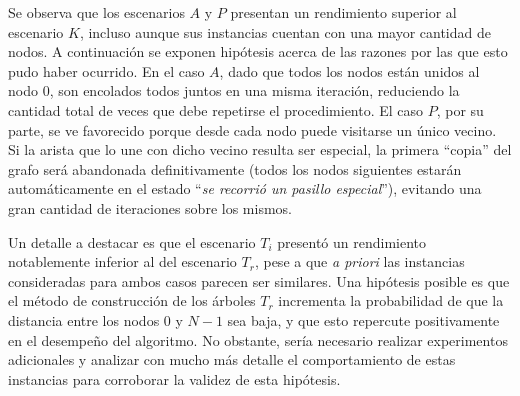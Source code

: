     Se observa que los escenarios $A$ y $P$ presentan un rendimiento
    superior al escenario $K$, incluso aunque sus instancias cuentan con una
    mayor cantidad de nodos. A continuación se exponen hipótesis acerca de
    las razones por las que esto pudo haber ocurrido. En el caso $A$, dado que
    todos los nodos están unidos al nodo $0$, son encolados todos juntos en
    una misma iteración, reduciendo la cantidad total de veces que debe
    repetirse el procedimiento. El caso $P$, por su parte, se ve favorecido
    porque desde cada nodo puede visitarse un único vecino. Si la arista que
    lo une con dicho vecino resulta ser especial, la primera ``copia'' del
    grafo será abandonada definitivamente (todos los nodos siguientes
    estarán automáticamente en el estado ``\emph{se recorrió un pasillo
    especial}''), evitando una gran cantidad de iteraciones sobre los
    mismos.

    Un detalle a destacar es que el escenario $T_i$ presentó un rendimiento
    notablemente inferior al del escenario $T_r$, pese a que \emph{a priori}
    las instancias consideradas para ambos casos parecen ser similares. Una
    hipótesis posible es que el método de construcción de los árboles $T_r$
    incrementa la probabilidad de que la distancia entre los nodos $0$ y
    $N-1$ sea baja, y que esto repercute positivamente en el desempeño del
    algoritmo. No obstante, sería necesario realizar experimentos adicionales
    y analizar con mucho más detalle el comportamiento de estas instancias
    para corroborar la validez de esta hipótesis.


